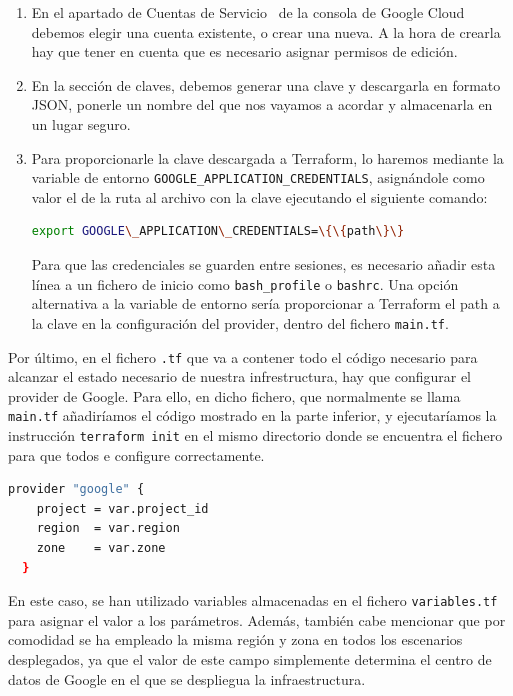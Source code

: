   \begin{enumerate}
    \item En el apartado de Cuentas de Servicio~\cite{des2} de la consola de Google Cloud debemos elegir una cuenta existente, o crear una nueva. A la hora de crearla hay que tener en cuenta que es necesario asignar permisos de edición.
    \item En la sección de claves, debemos generar una clave y descargarla en formato JSON, ponerle un nombre del que nos vayamos a acordar y almacenarla en un lugar seguro. 
    \item Para proporcionarle la clave descargada a Terraform, lo haremos mediante la variable de entorno \texttt{GOOGLE\_APPLICATION\_CREDENTIALS}, asignándole como valor el de la ruta al archivo con la clave ejecutando el siguiente comando:

      \begin{lstlisting}[language=Bash]
	export GOOGLE\_APPLICATION\_CREDENTIALS=\{\{path\}\}\end{lstlisting}

      Para que las credenciales se guarden entre sesiones, es necesario añadir esta línea a un fichero de inicio como \texttt{bash\_profile} o \texttt{bashrc}. Una opción alternativa a la variable de entorno sería proporcionar a Terraform el path a la clave en la configuración del provider, dentro del fichero \texttt{main.tf}.
  \end{enumerate}

  Por último, en el fichero \texttt{.tf} que va a contener todo el código necesario para alcanzar el estado necesario de nuestra infrestructura, hay que configurar el provider de Google. Para ello, en dicho fichero, que normalmente se llama \texttt{main.tf} añadiríamos el código mostrado en la parte inferior, y ejecutaríamos la instrucción \texttt{terraform init} en el mismo directorio donde se encuentra el fichero para que todos e configure correctamente. 

  \begin{lstlisting}[language=Bash]
  provider "google" {
    project = var.project_id
    region  = var.region
    zone    = var.zone
  }\end{lstlisting}

  En este caso, se han utilizado variables almacenadas en el fichero \texttt{variables.tf} para asignar el valor a los parámetros. Además, también cabe mencionar que por comodidad se ha empleado la misma región y zona en todos los escenarios desplegados, ya que el valor de este campo simplemente determina el centro de datos de Google en el que se despliegua la infraestructura.

